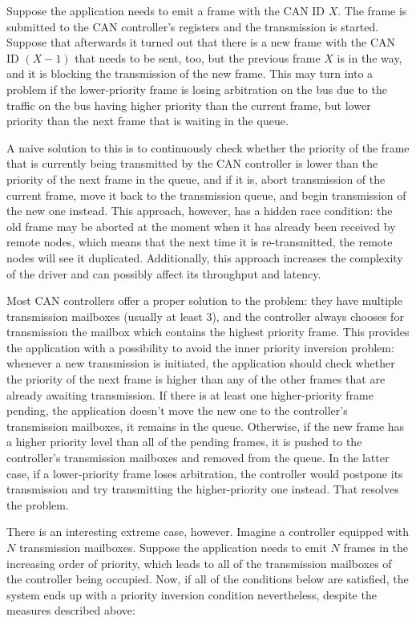 Suppose the application needs to emit a frame with the CAN ID $X$.
The frame is submitted to the CAN controller's registers and the transmission is started.
Suppose that afterwards it turned out that there is a new frame with the CAN ID $(X-1)$ that needs to be sent,
too, but the previous frame $X$ is in the way, and it is blocking the transmission of the new frame.
This may turn into a problem if the lower-priority frame is losing arbitration on the bus due
to the traffic on the bus having higher priority than the current frame,
but lower priority than the next frame that is waiting in the queue.

A naive solution to this is to continuously check whether the priority of the frame that is currently being
transmitted by the CAN controller is lower than the priority of the next frame in the queue, and if it is,
abort transmission of the current frame, move it back to the transmission queue,
and begin transmission of the new one instead.
This approach, however, has a hidden race condition:
the old frame may be aborted at the moment when it has already been received by remote nodes,
which means that the next time it is re-transmitted, the remote nodes will see it duplicated.
Additionally, this approach increases the complexity of the driver and can possibly affect
its throughput and latency.

Most CAN controllers offer a proper solution to the problem:
they have multiple transmission mailboxes (usually at least 3),
and the controller always chooses for transmission the mailbox which contains the highest priority frame.
This provides the application with a possibility to avoid the inner priority inversion problem:
whenever a new transmission is initiated, the application should check whether the priority of the next frame
is higher than any of the other frames that are already awaiting transmission.
If there is at least one higher-priority frame pending,
the application doesn't move the new one to the controller's transmission mailboxes,
it remains in the queue.
Otherwise, if the new frame has a higher priority level than all of the pending frames,
it is pushed to the controller's transmission mailboxes and removed from the queue.
In the latter case, if a lower-priority frame loses arbitration,
the controller would postpone its transmission and try transmitting the higher-priority one instead.
That resolves the problem.

There is an interesting extreme case, however.
Imagine a controller equipped with $N$ transmission mailboxes.
Suppose the application needs to emit $N$ frames in the increasing order of priority,
which leads to all of the transmission mailboxes of the controller being occupied.
Now, if all of the conditions below are satisfied, the system ends up with a priority inversion condition nevertheless,
despite the measures described above:

